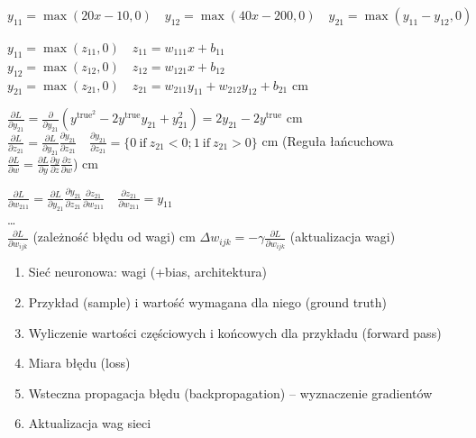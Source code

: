 \documentclass[11pt, xcolor={dvipsnames,svgnames},aspectratio=169]{beamer}
\theoremstyle{plain}
\begin{document}
\begin{frame}
	$y_{11} = \max(20x - 10, 0)\quad y_{12} = \max(40x - 200, 0) \quad y_{21} = \max(y_{11} - y_{12}, 0)$ \\\pause 
	
	$y_{11} = \max(z_{11}, 0) \quad z_{11} = w_{111}x + b_{11}$\\
	$y_{12} = \max(z_{12}, 0) \quad z_{12} = w_{121}x + b_{12}$\\
	$y_{21} = \max(z_{21}, 0) \quad z_{21} = w_{211}y_{11} + w_{212}y_{12} + b_{21}$ cm\pause

	$\frac{\partial L}{\partial y_{21}} = \frac{\partial }{\partial y_{21}} (y^{\text{true}^2} - 2y^{\text{true}}y_{21} + y_{21}^2) = 2y_{21} - 2y^{\text{true}}$ cm\pause
	$\frac{\partial L}{\partial z_{21}} = \frac{\partial L}{\partial y_{21}}\frac{\partial y_{21}}{\partial z_{21}} \quad \frac{\partial y_{21}}{\partial z_{21}} = \{0\:\text{if}\: z_{21} < 0; 1\:\text{if}\: z_{21} > 0 \}$ cm
	(Reguła łańcuchowa $\frac{\partial L}{\partial w} = \frac{\partial L}{\partial y} \frac{\partial y}{\partial z} \frac{\partial z}{\partial w}$) cm\pause
	
	$\frac{\partial L}{\partial w_{211}} =  \frac{\partial L}{\partial y_{21}}\frac{\partial y_{21}}{\partial z_{21}}\frac{\partial z_{21}}{\partial w_{211}}  \quad  \frac{\partial z_{21}}{\partial w_{211}} = y_{11}$\\\pause
	\dots \\\pause
	$\frac{\partial L}{\partial w_{ijk}}$ (zależność błędu od wagi) cm\pause
	$\Delta w_{ijk} = - \gamma \frac{\partial L}{\partial w_{ijk}}$ (aktualizacja wagi)
\end{frame}
\begin{frame}
	\begin{enumerate}
		\item Sieć neuronowa: wagi (+bias, architektura)
		\item Przykład (sample) i wartość wymagana dla niego (ground truth)
		\item Wyliczenie wartości częściowych i końcowych dla przykładu (forward pass)
		\item Miara błędu (loss)
		\item Wsteczna propagacja błędu (backpropagation) -- wyznaczenie gradientów
		\item Aktualizacja wag sieci
	\end{enumerate}
\end{frame}
\end{document}
